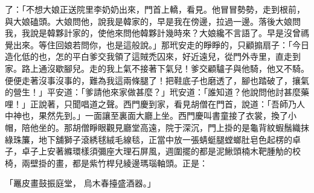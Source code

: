 了：「不想大娘正送院里李奶奶出來，門首上轎，看見。他冒冒勢勢，走到根前，與大娘磕頭。大娘問他，說我是韓家的，早是我在傍邊，拉過一邊。落後大娘問我，我說是韓夥計家的，使他來問他韓夥計幾時來？大娘纔不言語了。早是沒曾禡覺出來。等住回娘若問你，也是這般說。」那玳安走的睜睜的，只顧搧扇子：「今日造化低的也，怎的平白爹交我領了這賊禿囚來，好近遠兒，從門外寺里，直走到家。路上通沒歇腳兒。走的我上氣不接著下氣兒！爹交顧驢子與他騎，他又不騎。便便走著沒事沒事的，難為我這兩條腿了！把鞋底子也磨透了，腳也踏破了，攘氣的營生！」平安道：「爹請他來家做甚麼？」玳安道：「誰知道？他說問他討甚麼藥哩！」正說著，只聞唱道之聲。西門慶到家，看見胡僧在門首，說道：「吾師乃人中神也，果然先到。」一面讓至裏面大廳上坐。西門慶叫書童接了衣裳，換了小帽，陪他坐的。那胡僧睜眼觀見廳堂高遠，院于深沉，門上掛的是龜背紋蝦鬚織抹綠珠簾，地下舖獅子滾綉毬絨毛線毯，正當中放一張蜻蜓腿螳螂肚皂色起楞的卓子，卓子上安著縧環樣須彌座大理石屏風，週圍擺的都是泥鰍頭楠木靶腫觔的校椅，兩壁掛的畫，都是紫竹桿兒綾邊瑪瑙軸頭。正是：

「鼉皮畫鼓振庭堂， 烏木春擡盛酒器。」

